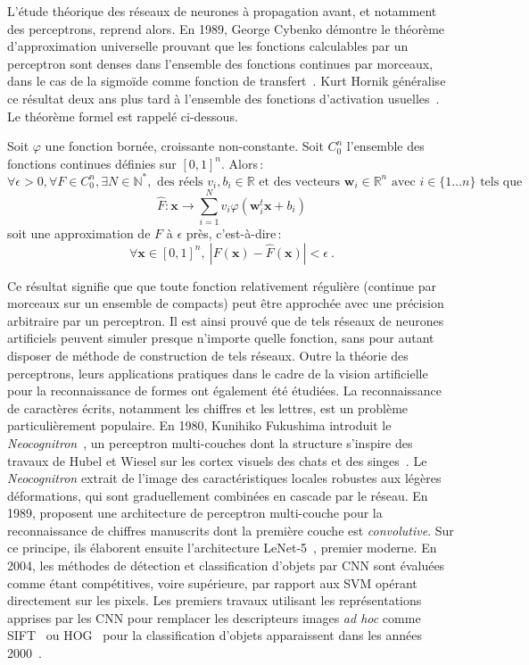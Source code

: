L'étude théorique des réseaux de neurones à propagation avant, et notamment des perceptrons, reprend alors. En 1989, George Cybenko démontre le théorème d'approximation universelle prouvant que les fonctions calculables par un perceptron sont denses dans l'ensemble des fonctions continues par morceaux, dans le cas de la sigmoïde comme fonction de transfert~\cite{cybenko_approximation_1989}. Kurt Hornik généralise ce résultat deux ans plus tard à l'ensemble des fonctions d'activation usuelles~\cite{hornik_approximation_1991}. Le théorème formel est rappelé ci-dessous.

\begin{theorem}
Soit $\varphi$ une fonction bornée, croissante non-constante. Soit $C_0^n$ l'ensemble des fonctions continues définies sur $[0,1]^n$. Alors\,:
$$\forall \epsilon > 0, \forall F \in C_0^n, \exists N \in \mathbb{N}^{*}, \text{ des réels } v_i, b_i \in \mathbb{R} \text{ et des vecteurs } \mathbf{w}_i \in \mathbb{R}^n \text{ avec } i \in \{1\dots{}n\} \text{ tels que}$$
$$\hat{F} : \mathbf{x} \rightarrow \sum_{i=1}^N v_i \varphi\left(\mathbf{w}_i^t \mathbf{x} + b_i \right)$$
soit une approximation de $F$ à $\epsilon$ près, c'est-à-dire\,:
$$\forall \mathbf{x} \in [0,1]^n, ~\left| F(\mathbf{x}) - \hat{F}(\mathbf{x}) \right| < \epsilon~.$$
\end{theorem}

Ce résultat signifie que que toute fonction relativement régulière (continue par morceaux sur un ensemble de compacts) peut être approchée avec une précision arbitraire par un perceptron. Il est ainsi prouvé que de tels réseaux de neurones artificiels peuvent simuler presque n'importe quelle fonction, sans pour autant disposer de méthode de construction de tels réseaux. Outre la théorie des perceptrons, leurs applications pratiques dans le cadre de la vision artificielle pour la reconnaissance de formes ont également été étudiées. La reconnaissance de caractères écrits, notamment les chiffres et les lettres, est un problème particulièrement populaire. En 1980, Kunihiko Fukushima introduit le \emph{Neocognitron}~\cite{fukushima_neocognitron_1980}, un perceptron multi-couches dont la structure s'inspire des travaux de Hubel et Wiesel sur les cortex visuels des chats et des singes~\cite{hubel_receptive_1959,hubel_receptive_1968}. Le \emph{Neocognitron} extrait de l'image des caractéristiques locales robustes aux légères déformations, qui sont graduellement combinées en cascade par le réseau. En 1989, \citet{lecun_backpropagation_1989} proposent une architecture de perceptron multi-couche pour la reconnaissance de chiffres manuscrits dont la première couche est \emph{convolutive}. Sur ce principe, ils élaborent ensuite l'architecture LeNet-5~\cite{lecun_gradient-based_1998}, premier  moderne. En 2004, les méthodes de détection et classification d'objets par \gls{CNN} sont évaluées comme étant compétitives, voire supérieure, par rapport aux \gls{SVM} opérant directement sur les pixels. Les premiers travaux utilisant les représentations apprises par les \gls{CNN} pour remplacer les descripteurs images \emph{ad hoc} comme \gls{SIFT}~\cite{lowe_object_1999} ou \gls{HOG}~\cite{dalal_histograms_2005} pour la classification d'objets apparaissent dans les années 2000~\cite{serre_object_2005,huang_large-scale_2006}.


